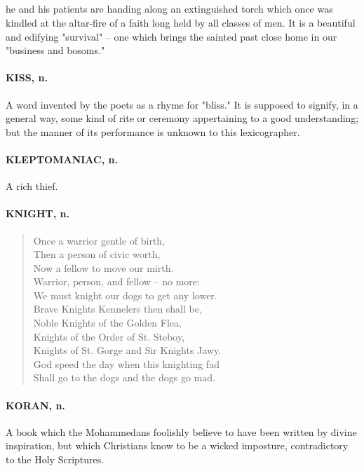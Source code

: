 \documentclass[11pt]{article}
\begin{document}
\subparagraph{} he and his patients are handing along an extinguished torch which once
was kindled at the altar-fire of a faith long held by all classes of
men.  It is a beautiful and edifying "survival" -- one which brings
the sainted past close home in our "business and bosoms."

\paragraph{KISS, n.}  A word invented by the poets as a rhyme for "bliss."  It is
supposed to signify, in a general way, some kind of rite or ceremony
appertaining to a good understanding; but the manner of its
performance is unknown to this lexicographer.

\paragraph{KLEPTOMANIAC, n.}  A rich thief.

\paragraph{KNIGHT, n.}

\begin{quote}   Once a warrior gentle of birth, \\
  Then a person of civic worth, \\
  Now a fellow to move our mirth. \\
  Warrior, person, and fellow -- no more: \\
  We must knight our dogs to get any lower. \\
  Brave Knights Kennelers then shall be, \\
  Noble Knights of the Golden Flea, \\
  Knights of the Order of St. Steboy, \\
  Knights of St. Gorge and Sir Knights Jawy. \\
  God speed the day when this knighting fad \\
  Shall go to the dogs and the dogs go mad.  \end{quote}

\paragraph{KORAN, n.}  A book which the Mohammedans foolishly believe to have been
written by divine inspiration, but which Christians know to be a
wicked imposture, contradictory to the Holy Scriptures.
\end{document}
